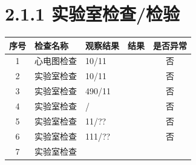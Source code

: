\documentclass[UTF8,10pt,a4paper,fontset=fandol]{ctexart}
\newcommand{\fieldvalue}[1]{#1}
\newcommand{\handwritten}[1]{#1}
\begin{document}
\vspace{0.5em}

\section*{2.1.1 实验室检查/检验}

\begin{tabularx}{\textwidth}{|c|X|X|X|c|}
\hline
序号 & 检查名称 & 观察结果 & 结果 & 是否异常 \\
\hline
1 & 心电图检查 & 
\fieldvalue{\handwritten{10/11}} &
\fieldvalue{\handwritten{\checkmark}} & 否 \\
\hline
2 & 实验室检查 & 
\fieldvalue{\handwritten{10/11}} &
\fieldvalue{\handwritten{\checkmark}} & 否 \\
\hline
3 & 实验室检查 & 
\fieldvalue{\handwritten{490/11}} &
\fieldvalue{\handwritten{\checkmark}} & 否 \\
\hline
4 & 实验室检查 & 
\fieldvalue{\handwritten{/}} &
\fieldvalue{\handwritten{\checkmark}} & 否 \\
\hline
5 & 实验室检查 & 
\fieldvalue{\handwritten{11/??}} &
\fieldvalue{\handwritten{\checkmark}} & 否 \\
\hline
6 & 实验室检查 & 
\fieldvalue{\handwritten{111/??}} &
\fieldvalue{\handwritten{\checkmark}} & 否 \\
\hline
7 & 实验室检查 & 

\end{tabularx}
\end{document}
